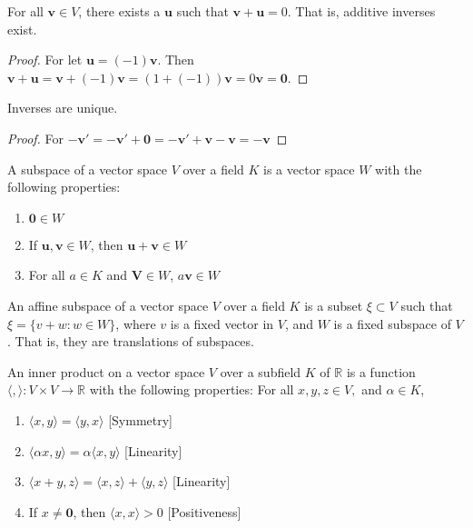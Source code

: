             \begin{theorem}
            For all $\mathbf{v}\in V$, there exists a $\mathbf{u}$ such that $\mathbf{v}+\mathbf{u}=0$. That is, additive inverses exist.
            \end{theorem}
            \begin{proof}
            For let $\mathbf{u} = (-1)\mathbf{v}$. Then $\mathbf{v}+\mathbf{u} = \mathbf{v}+(-1)\mathbf{v} = (1+(-1))\mathbf{v} = 0\mathbf{v} = \mathbf{0}$.
            \end{proof}
            \begin{theorem}
            Inverses are unique.
            \end{theorem}
            \begin{proof}
            For $-\mathbf{v}'=-\mathbf{v}'+\mathbf{0}=-\mathbf{v}'+\mathbf{v}-\mathbf{v}=- \mathbf{v}$
            \end{proof}
            \begin{definition}
            A subspace of a vector space $V$ over a field $K$ is a vector space $W$ with the following properties:
            \begin{enumerate}
                \item $\mathbf{0} \in W$
                \item If $\mathbf{u,v}\in W$, then $\mathbf{u}+\mathbf{v} \in W$
                \item For all $a\in K$ and $\mathbf{V} \in W$, $a\mathbf{v} \in W$
            \end{enumerate}
            \end{definition}
            \begin{definition}
            An affine subspace of a vector space $V$ over a field $K$ is a subset $\xi\subset V$ such that $\xi = \{v+w:w\in W\}$, where $v$ is a fixed vector in $V$, and $W$ is a fixed subspace of $V$. That is, they are translations of subspaces.
            \end{definition}
            \begin{definition}
            An inner product on a vector space $V$ over a subfield $K$ of $\mathbb{R}$ is a function $\langle , \rangle:V\times V\rightarrow \mathbb{R}$ with the following properties: For all $x,y,z \in V,$ and $\alpha \in K$,
            \begin{enumerate}
                \item $\langle x,y \rangle = \langle y,x \rangle$ \hfill [Symmetry]
                \item $\langle \alpha x, y \rangle = \alpha \langle x,y \rangle$ \hfill [Linearity]
                \item $\langle x+y,z \rangle = \langle x,z\rangle + \langle y,z \rangle$ \hfill [Linearity]
                \item  If $x\ne \mathbf{0}$, then $\langle x,x\rangle >0$ \hfill [Positiveness]
            \end{enumerate}
            \end{definition}

